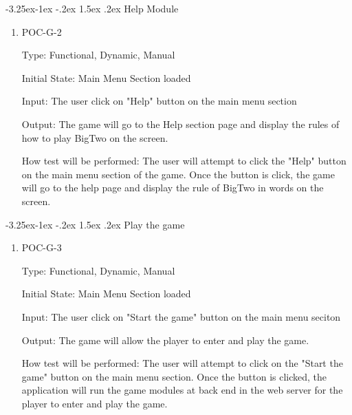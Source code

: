 \documentclass[12pt, titlepage]{article}
\makeatletter
\renewcommand\paragraph{\@startsection{paragraph}{4}{\z@}%
                                     {-3.25ex\@plus -1ex \@minus -.2ex}%
                                     {1.5ex \@plus .2ex}%
                                     {\normalfont\normalsize\bfseries}}
\makeatother
\begin{document}
\paragraph{Help Module}

\begin{enumerate}

\item{POC-G-2\\}

Type: Functional, Dynamic, Manual
					
Initial State: Main Menu Section loaded
					
Input: The user click on "Help" button on the main menu section
					
Output: The game will go to the Help section page and display the rules of how to play BigTwo on the screen.
					
How test will be performed: The user will attempt to click the "Help" button on the main menu section of the game. Once the button is click, the game will go to the help page and display the rule of BigTwo in words on the screen.

\end{enumerate}

\paragraph{Play the game}

\begin{enumerate}

\item{POC-G-3\\}

Type: Functional, Dynamic, Manual
					
Initial State: Main Menu Section loaded
					
Input: The user click on "Start the game" button on the main menu seciton 
					
Output: The game will allow the player to enter and play the game.
					
How test will be performed: The user will attempt to click on the "Start the game" button on the main menu section. Once the button is clicked, the application will run the game modules at back end in the web server for the player to enter and play the game.

\end{enumerate}
	
\end{document}
